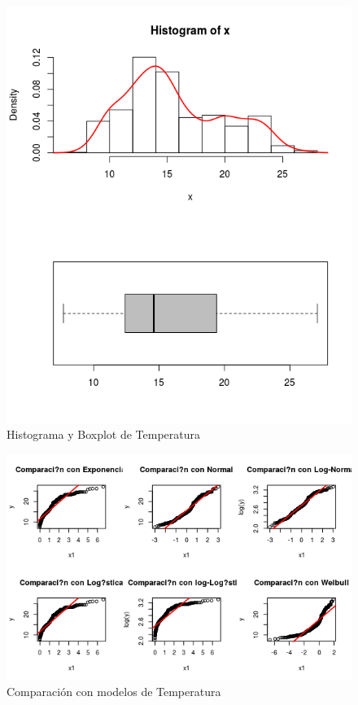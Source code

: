 \documentclass{article}
\begin{document}
\begin{enumerate}[a)]
\begin{figure}[h!]
\centering
\includegraphics[scale=0.5]{./figures/histplot_Temperartura.png}
\caption{Histograma y Boxplot de Temperatura}
\end{figure}

\begin{figure}[h!]
\centering
\includegraphics[scale=0.5]{./figures/cm_Temperatura.png}
\caption{Comparación con modelos de Temperatura}
\end{figure}


\end{enumerate}
\end{document}
